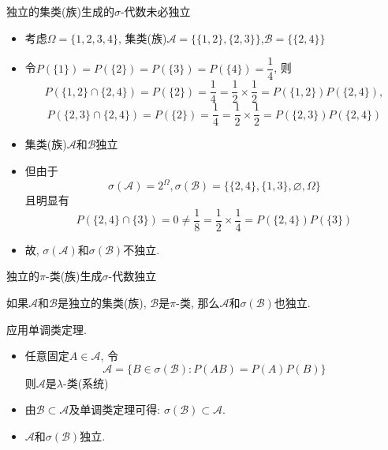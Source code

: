 \documentclass[Prob-All.tex]{subfiles}
\begin{document}
\begin{frame}{独立的集类(族)生成的$\sigma$-代数未必独立}


\begin{itemize}[<+-|alert@+>]
  \item 考虑$\Omega=\{1,2,3,4\}$, 集类(族)$\mathcal{A}=\{\{1,2\},\{2,3\}\}$,$ \mathcal{B}=\{\{2,4\}\}$
  \item 令$P(\{1\})=P(\{2\})=P(\{3\})=P(\{4\})=\dfrac{1}{4}$, 则
  \[P(\{1,2\} \cap\{2,4\})=P(\{2\})=\frac{1}{4}=\frac{1}{2} \times \frac{1}{2}=P(\{1,2\}) P(\{2,4\}), \]
  \[P(\{2,3\} \cap\{2,4\})=P(\{2\})=\frac{1}{4}=\frac{1}{2} \times \frac{1}{2}=P(\{2,3\}) P(\{2,4\})\]
  \item 集类(族)$\mathcal{A}$和$\mathcal{B}$独立
  \item 但由于
  \[
  \sigma(\mathcal{A})=2^{\Omega},  \sigma(\mathcal{B})=\{\{2,4\},\{1,3\}, \varnothing, \Omega\}
  \]
  且明显有
  \[
  P(\{2,4\} \cap\{3\})=0 \neq \frac{1}{8}=\frac{1}{2} \times \frac{1}{4}=P(\{2,4\}) P(\{3\})
  \]
  \item 故, $\sigma(\mathcal{A})$和$\sigma(\mathcal{B})$不独立.
\end{itemize}




\end{frame}

\begin{frame}{独立的$\pi$-类(族)生成$\sigma$-代数独立}
\begin{thm}
如果$\mathcal{A}$和$\mathcal{B}$是独立的集类(族), $\mathcal{B}$是$\pi$-类, 那么$\mathcal{A}$和$\sigma(\mathcal{B})$也独立.
\end{thm}
\pause

\zheng 应用单调类定理.
\begin{itemize}[<+-|alert@+>]
  \item 任意固定$A \in \mathcal{A}$, 令
\[
\mathscr{A}=\{B \in \sigma(\mathcal{B}): P(A B)=P(A) P(B)\}
\]
则$\mathscr{A}$是$\lambda$-类(系统)

\item 由$\mathcal{B} \subset \mathscr{A}$及单调类定理可得: $\sigma(\mathcal{B}) \subset \mathscr{A}$.
\item $\mathcal{A}$和$\sigma(\mathcal{B})$独立.


\end{itemize}


\end{frame}
\end{document}
